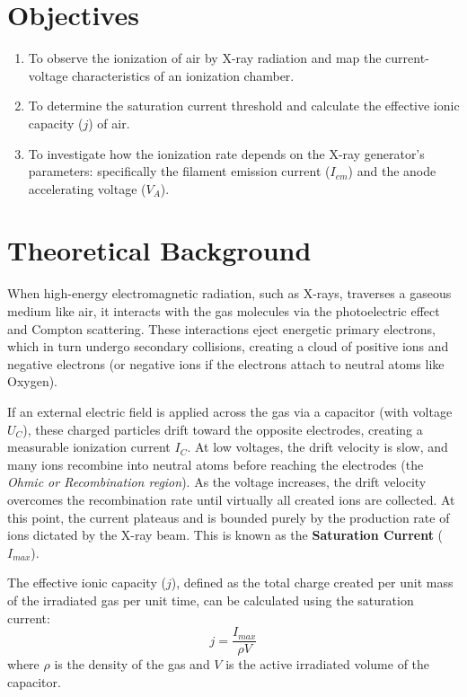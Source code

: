 \documentclass[a4paper,11pt]{article}
\begin{document}
\section{Objectives}
\begin{enumerate}
    \item To observe the ionization of air by X-ray radiation and map the current-voltage characteristics of an ionization chamber.
    \item To determine the saturation current threshold and calculate the effective ionic capacity ($j$) of air.
    \item To investigate how the ionization rate depends on the X-ray generator's parameters: specifically the filament emission current ($I_{em}$) and the anode accelerating voltage ($V_A$).
\end{enumerate}

\section{Theoretical Background}
When high-energy electromagnetic radiation, such as X-rays, traverses a gaseous medium like air, it interacts with the gas molecules via the photoelectric effect and Compton scattering. These interactions eject energetic primary electrons, which in turn undergo secondary collisions, creating a cloud of positive ions and negative electrons (or negative ions if the electrons attach to neutral atoms like Oxygen).

If an external electric field is applied across the gas via a capacitor (with voltage $U_C$), these charged particles drift toward the opposite electrodes, creating a measurable ionization current $I_C$. 
At low voltages, the drift velocity is slow, and many ions recombine into neutral atoms before reaching the electrodes (the \textit{Ohmic or Recombination region}). As the voltage increases, the drift velocity overcomes the recombination rate until virtually all created ions are collected. At this point, the current plateaus and is bounded purely by the production rate of ions dictated by the X-ray beam. This is known as the \textbf{Saturation Current} ($I_{max}$).

The effective ionic capacity ($j$), defined as the total charge created per unit mass of the irradiated gas per unit time, can be calculated using the saturation current:
\begin{equation}
    j = \frac{I_{max}}{\rho V}
\end{equation}
where $\rho$ is the density of the gas and $V$ is the active irradiated volume of the capacitor.
\end{document}
